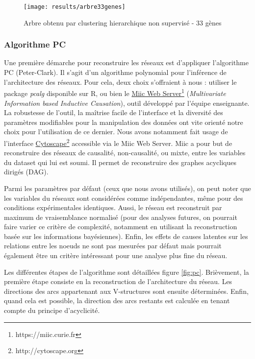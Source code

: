 \documentclass[fleqn,11pt]{SelfArx} %
\begin{document}
\begin{figure}[ht]
\centering
\texttt{[image: results/arbre33genes]}
\caption{Arbre obtenu par clustering hierarchique non supervisé - 33 gènes}
\label{fig:arbre33}
\end{figure}

\subsubsection{Algorithme PC}
Une première démarche pour reconstruire les réseaux est d'appliquer l'algorithme PC\cite{pc} (Peter-Clark). Il s'agit d'un algorithme polynomial pour l'inférence de l'architecture des réseaux. Pour cela, deux choix s'offraient à nous : utiliser le package \textit{pcalg} disponible sur R, ou bien le \href{https://miic.curie.fr}{Miic Web Server}\footnote{https://miic.curie.fr} (\textit{Multivariate Information based Inductive Causation}), outil développé par l'équipe enseignante. La robustesse de l'outil, la maîtrise facile de l'interface et la diversité des paramètres modifiables pour la manipulation des données ont vite orienté notre choix pour l'utilisation de ce dernier. Nous avons notamment fait usage de l'interface \href{http://cytoscape.org}{Cytoscape}\footnote{http://cytoscape.org} accessible via le Miic Web Server. Miic a pour but de reconstruire des réseaux de causalité, non-causalité, ou mixte, entre les variables du dataset qui lui est soumi. Il permet de reconstruire des graphes acycliques dirigés (DAG). 

\par Parmi les paramètres par défaut (ceux que nous avons utilisés), on peut noter que les variables du réseaux sont considérées comme indépendantes, même pour des conditions expérimentales identiques. Aussi, le réseau est reconstruit par maximum de vraisemblance normalisé (pour des analyses futures, on pourrait faire varier ce critère de complexité, notamment en utilisant la reconstruction basée sur les informations bayésiennes). Enfin, les effets de causes latentes sur les relations entre les noeuds ne sont pas mesurées par défaut mais pourrait également être un critère intéressant pour une analyse plus fine du réseau. 

\par Les différentes étapes de l'algorithme sont détaillées figure \ref{fig:pc}. Brièvement, la première étape consiste en la reconstruction de l'architecture du réseau. Les directions des arcs appartenant aux V-structures sont ensuite déterminées. Enfin, quand cela est possible, la direction des arcs restants est calculée en tenant compte du principe d'acyclicité. 
\end{document}

